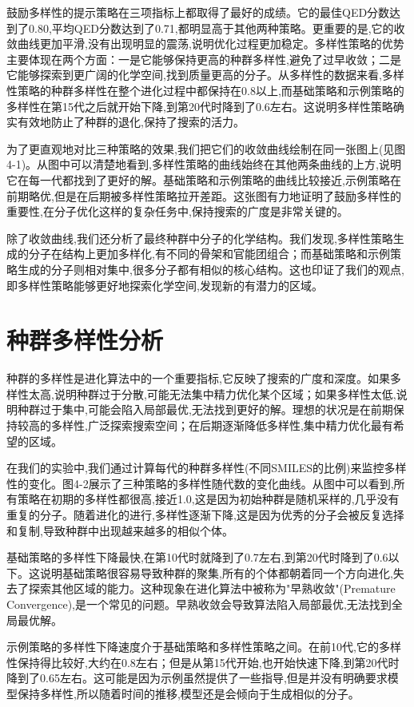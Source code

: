 鼓励多样性的提示策略在三项指标上都取得了最好的成绩。它的最佳QED分数达到了0.80,平均QED分数达到了0.71,都明显高于其他两种策略。更重要的是,它的收敛曲线更加平滑,没有出现明显的震荡,说明优化过程更加稳定。多样性策略的优势主要体现在两个方面：一是它能够保持更高的种群多样性,避免了过早收敛；二是它能够探索到更广阔的化学空间,找到质量更高的分子。从多样性的数据来看,多样性策略的种群多样性在整个进化过程中都保持在0.8以上,而基础策略和示例策略的多样性在第15代之后就开始下降,到第20代时降到了0.6左右。这说明多样性策略确实有效地防止了种群的退化,保持了搜索的活力。

为了更直观地对比三种策略的效果,我们把它们的收敛曲线绘制在同一张图上(见图4-1)。从图中可以清楚地看到,多样性策略的曲线始终在其他两条曲线的上方,说明它在每一代都找到了更好的解。基础策略和示例策略的曲线比较接近,示例策略在前期略优,但是在后期被多样性策略拉开差距。这张图有力地证明了鼓励多样性的重要性,在分子优化这样的复杂任务中,保持搜索的广度是非常关键的。

除了收敛曲线,我们还分析了最终种群中分子的化学结构。我们发现,多样性策略生成的分子在结构上更加多样化,有不同的骨架和官能团组合；而基础策略和示例策略生成的分子则相对集中,很多分子都有相似的核心结构。这也印证了我们的观点,即多样性策略能够更好地探索化学空间,发现新的有潜力的区域。

\section{种群多样性分析}

种群的多样性是进化算法中的一个重要指标,它反映了搜索的广度和深度。如果多样性太高,说明种群过于分散,可能无法集中精力优化某个区域；如果多样性太低,说明种群过于集中,可能会陷入局部最优,无法找到更好的解。理想的状况是在前期保持较高的多样性,广泛探索搜索空间；在后期逐渐降低多样性,集中精力优化最有希望的区域。

在我们的实验中,我们通过计算每代的种群多样性(不同SMILES的比例)来监控多样性的变化。图4-2展示了三种策略的多样性随代数的变化曲线。从图中可以看到,所有策略在初期的多样性都很高,接近1.0,这是因为初始种群是随机采样的,几乎没有重复的分子。随着进化的进行,多样性逐渐下降,这是因为优秀的分子会被反复选择和复制,导致种群中出现越来越多的相似个体。

基础策略的多样性下降最快,在第10代时就降到了0.7左右,到第20代时降到了0.6以下。这说明基础策略很容易导致种群的聚集,所有的个体都朝着同一个方向进化,失去了探索其他区域的能力。这种现象在进化算法中被称为"早熟收敛"(Premature Convergence),是一个常见的问题。早熟收敛会导致算法陷入局部最优,无法找到全局最优解。

示例策略的多样性下降速度介于基础策略和多样性策略之间。在前10代,它的多样性保持得比较好,大约在0.8左右；但是从第15代开始,也开始快速下降,到第20代时降到了0.65左右。这可能是因为示例虽然提供了一些指导,但是并没有明确要求模型保持多样性,所以随着时间的推移,模型还是会倾向于生成相似的分子。

